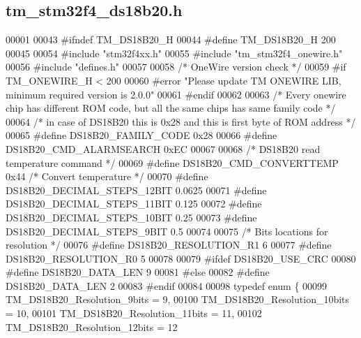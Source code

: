 \hypertarget{tm__stm32f4__ds18b20_8h_source}{}\subsection{tm\+\_\+stm32f4\+\_\+ds18b20.\+h}

\begin{DoxyCode}
00001 
00043 \textcolor{preprocessor}{#ifndef TM\_DS18B20\_H}
00044 \textcolor{preprocessor}{#define TM\_DS18B20\_H 200}
00045 
00054 \textcolor{preprocessor}{#include "stm32f4xx.h"}
00055 \textcolor{preprocessor}{#include "tm\_stm32f4\_onewire.h"}
00056 \textcolor{preprocessor}{#include "defines.h"}
00057 
00058 \textcolor{comment}{/* OneWire version check */}
00059 \textcolor{preprocessor}{#if TM\_ONEWIRE\_H < 200}
00060 \textcolor{preprocessor}{#error "Please update TM ONEWIRE LIB, minimum required version is 2.0.0"}
00061 \textcolor{preprocessor}{#endif}
00062 
00063 \textcolor{comment}{/* Every onewire chip has different ROM code, but all the same chips has same family code */}
00064 \textcolor{comment}{/* in case of DS18B20 this is 0x28 and this is first byte of ROM address */}
00065 \textcolor{preprocessor}{#define DS18B20\_FAMILY\_CODE             0x28}
00066 \textcolor{preprocessor}{#define DS18B20\_CMD\_ALARMSEARCH         0xEC}
00067 
00068 \textcolor{comment}{/* DS18B20 read temperature command */}
00069 \textcolor{preprocessor}{#define DS18B20\_CMD\_CONVERTTEMP         0x44    }\textcolor{comment}{/* Convert temperature */}\textcolor{preprocessor}{}
00070 \textcolor{preprocessor}{#define DS18B20\_DECIMAL\_STEPS\_12BIT     0.0625}
00071 \textcolor{preprocessor}{#define DS18B20\_DECIMAL\_STEPS\_11BIT     0.125}
00072 \textcolor{preprocessor}{#define DS18B20\_DECIMAL\_STEPS\_10BIT     0.25}
00073 \textcolor{preprocessor}{#define DS18B20\_DECIMAL\_STEPS\_9BIT      0.5}
00074 
00075 \textcolor{comment}{/* Bits locations for resolution */}
00076 \textcolor{preprocessor}{#define DS18B20\_RESOLUTION\_R1           6}
00077 \textcolor{preprocessor}{#define DS18B20\_RESOLUTION\_R0           5}
00078 
00079 \textcolor{preprocessor}{#ifdef DS18B20\_USE\_CRC  }
00080 \textcolor{preprocessor}{#define DS18B20\_DATA\_LEN                9}
00081 \textcolor{preprocessor}{#else}
00082 \textcolor{preprocessor}{#define DS18B20\_DATA\_LEN                2}
00083 \textcolor{preprocessor}{#endif}
00084 
00098 \textcolor{keyword}{typedef} \textcolor{keyword}{enum} \{
00099     TM\_DS18B20\_Resolution\_9bits = 9,
00100     TM\_DS18B20\_Resolution\_10bits = 10,
00101     TM\_DS18B20\_Resolution\_11bits = 11,
00102     TM\_DS18B20\_Resolution\_12bits = 12

\end{DoxyCode}
